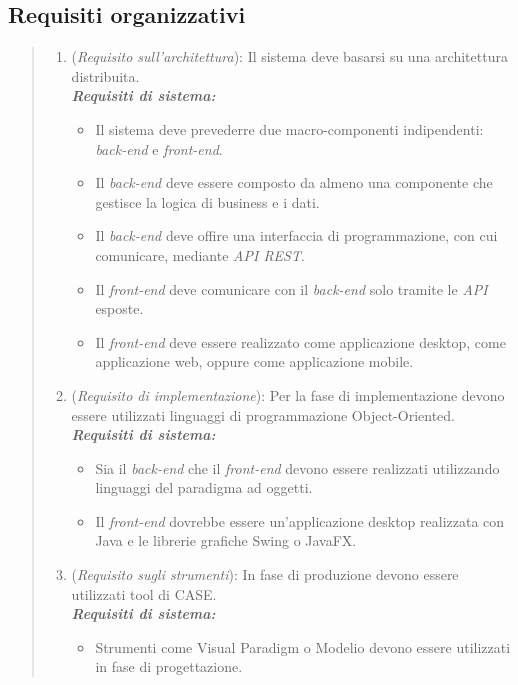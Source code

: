 \subsection{Requisiti organizzativi}

\begin{quote}
\begin{enumerate}[label=\textit{RO\arabic*}]
  \item (\textit{Requisito sull'architettura}): Il sistema deve basarsi su una architettura distribuita. \\
    \textbf{\textit{Requisiti di sistema:}} 
    \begin{itemize}
        \item Il sistema deve prevederre due macro-componenti indipendenti: \textit{back-end} e \textit{front-end}.
        \item Il \textit{back-end} deve essere composto da almeno una componente che gestisce la logica di business e i dati.
        \item Il \textit{back-end} deve offire una interfaccia di programmazione, con cui comunicare, mediante \textit{API REST}.
        \item Il \textit{front-end} deve comunicare con il \textit{back-end} solo tramite le \textit{API} esposte.
        \item Il \textit{front-end} deve essere realizzato come applicazione desktop, come applicazione web, oppure come applicazione mobile.
    \end{itemize} 
    
  \item (\textit{Requisito di implementazione}): Per la fase di implementazione devono essere utilizzati linguaggi di programmazione Object-Oriented. \\
  \textbf{\textit{Requisiti di sistema:}} 
    \begin{itemize}
        \item Sia il \textit{back-end} che il \textit{front-end} devono essere realizzati utilizzando linguaggi del paradigma ad oggetti.
        \item Il \textit{front-end} dovrebbe essere un'applicazione desktop realizzata con Java e le librerie grafiche Swing o JavaFX.
    \end{itemize} 
  
  \item (\textit{Requisito sugli strumenti}): In fase di produzione devono essere utilizzati tool di CASE. \\
  \textbf{\textit{Requisiti di sistema:}} 
    \begin{itemize}
        \item Strumenti come Visual Paradigm o Modelio devono essere utilizzati in fase di progettazione.
    \end{itemize}
  

\end{enumerate}
\end{quote}
